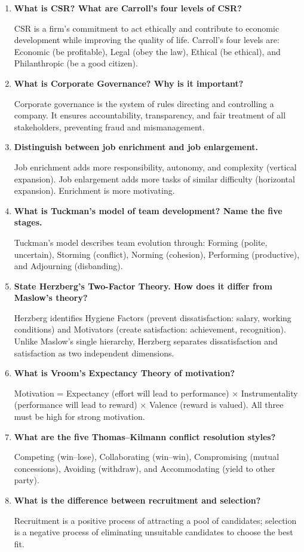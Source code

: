 \documentclass[12pt,a4paper]{article}
\newcommand{\Q}[1]{\textbf{#1}\par\noindent\ignorespaces}
\begin{document}
\begin{tcolorbox}[exambox, title={\textbf{Frequently Asked / Viva Questions}}]
\begin{enumerate}[topsep=0pt, label=\textbf{Q\arabic*.}, itemsep=5pt]
  \item \Q{What is CSR? What are Carroll's four levels of CSR?}
    CSR is a firm's commitment to act ethically and contribute to economic development while improving the quality of life. Carroll's four levels are: Economic (be profitable), Legal (obey the law), Ethical (be ethical), and Philanthropic (be a good citizen).
  \item \Q{What is Corporate Governance? Why is it important?}
    Corporate governance is the system of rules directing and controlling a company. It ensures accountability, transparency, and fair treatment of all stakeholders, preventing fraud and mismanagement.
  \item \Q{Distinguish between job enrichment and job enlargement.}
    Job enrichment adds more responsibility, autonomy, and complexity (vertical expansion). Job enlargement adds more tasks of similar difficulty (horizontal expansion). Enrichment is more motivating.
  \item \Q{What is Tuckman's model of team development? Name the five stages.}
    Tuckman's model describes team evolution through: Forming (polite, uncertain), Storming (conflict), Norming (cohesion), Performing (productive), and Adjourning (disbanding).
  \item \Q{State Herzberg's Two-Factor Theory. How does it differ from Maslow's theory?}
    Herzberg identifies Hygiene Factors (prevent dissatisfaction: salary, working conditions) and Motivators (create satisfaction: achievement, recognition). Unlike Maslow's single hierarchy, Herzberg separates dissatisfaction and satisfaction as two independent dimensions.
  \item \Q{What is Vroom's Expectancy Theory of motivation?}
    Motivation = Expectancy (effort will lead to performance) $\times$ Instrumentality (performance will lead to reward) $\times$ Valence (reward is valued). All three must be high for strong motivation.
  \item \Q{What are the five Thomas--Kilmann conflict resolution styles?}
    Competing (win--lose), Collaborating (win--win), Compromising (mutual concessions), Avoiding (withdraw), and Accommodating (yield to other party).
  \item \Q{What is the difference between recruitment and selection?}
    Recruitment is a positive process of attracting a pool of candidates; selection is a negative process of eliminating unsuitable candidates to choose the best fit.

\end{enumerate}
\end{tcolorbox}
\end{document}
